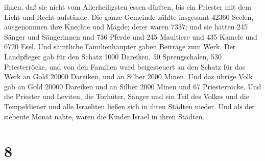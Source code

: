 ihnen, daß sie nicht vom Allerheiligsten essen dürften, bis ein Priester
mit dem Licht und Recht aufstände.  Die ganze Gemeinde
zählte insgesamt 42360 Seelen,  ausgenommen ihre Knechte
und Mägde; derer waren 7337;  und sie hatten 245 Sänger
und Sängerinnen  und 736 Pferde und 245 Maultiere und 435
Kamele und 6720 Esel.  Und sämtliche Familienhäupter
gaben Beiträge zum Werk. Der Landpfleger gab für den Schatz 1000
Dareiken, 50 Sprengschalen, 530 Priesterröcke,  und von
den Familien ward beigesteuert an den Schatz für das Werk an Gold 20000
Dareiken, und an Silber 2000 Minen.  Und das übrige Volk
gab an Gold 20000 Dareiken und an Silber 2000 Minen und 67
Priesterröcke.  Und die Priester und Leviten, die
Torhüter, Sänger und ein Teil des Volkes und die Tempeldiener und alle
Israeliten ließen sich in ihren Städten nieder. Und als der siebente
Monat nahte, waren die Kinder Israel in ihren Städten.

\hypertarget{section-7}{%
\section{8}\label{section-7}}

